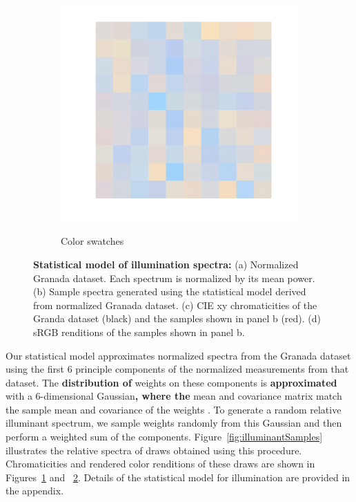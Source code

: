 \documentclass{jov}
\providecommand{\DIFaddtex}[1]{{\bf #1}} %
\providecommand{\DIFdeltex}[1]{} %
\providecommand{\DIFaddbegin}{} %
\providecommand{\DIFaddend}{} %
\providecommand{\DIFdelbegin}{} %
\providecommand{\DIFdelend}{} %
\providecommand{\DIFadd}[1]{\texorpdfstring{\DIFaddtex{#1}}{#1}} %
\providecommand{\DIFdel}[1]{\texorpdfstring{\DIFdeltex{#1}}{}} %
\newcommand{\DIFscaledelfig}{0.5}
\newlength{\DIFdelgraphicswidth} %
\newlength{\DIFdelgraphicsheight} %
\newcommand{\DIFaddincludegraphics}[2][]{{\color{blue}\fbox{\DIFOincludegraphics[#1]{#2}}}} %
\newcommand{\DIFdelincludegraphics}[2][]{%
\sbox{\DIFdelgraphicsbox}{\DIFOincludegraphics[#1]{#2}}%
\settoboxwidth{\DIFdelgraphicswidth}{\DIFdelgraphicsbox} %
\settoboxtotalheight{\DIFdelgraphicsheight}{\DIFdelgraphicsbox} %
\scalebox{\DIFscaledelfig}{%
\parbox[b]{\DIFdelgraphicswidth}{\usebox{\DIFdelgraphicsbox}\\[-\baselineskip] \rule{\DIFdelgraphicswidth}{0em}}\llap{\resizebox{\DIFdelgraphicswidth}{\DIFdelgraphicsheight}{%
\setlength{\unitlength}{\DIFdelgraphicswidth}%
\begin{picture}(1,1)%
\thicklines\linethickness{2pt} %
{\color[rgb]{1,0,0}\put(0,0){\framebox(1,1){}}}%
{\color[rgb]{1,0,0}\put(0,0){\line( 1,1){1}}}%
{\color[rgb]{1,0,0}\put(0,1){\line(1,-1){1}}}%
\end{picture}%
}\hspace*{3pt}}} %
} %
\DeclareRobustCommand{\DIFaddbegin}{\DIFOaddbegin \let\includegraphics\DIFaddincludegraphics} %
\DeclareRobustCommand{\DIFaddend}{\DIFOaddend \let\includegraphics\DIFOincludegraphics} %
\DeclareRobustCommand{\DIFdelbegin}{\DIFOdelbegin \let\includegraphics\DIFdelincludegraphics} %
\DeclareRobustCommand{\DIFdelend}{\DIFOaddend \let\includegraphics\DIFOincludegraphics} %
\begin{document}
\begin{figure}
\begin{subfigure}[b]{0.24 \textwidth}
        \label{fig:xyDiagram}
        \end{subfigure}
      	\begin{subfigure}[b]{0.24 \textwidth}
    \centering
        \caption{Color swatches}
        \includegraphics[width=\textwidth]{../FiguresDraft5/Figure6/Figure6_d.pdf}
        \label{fig:sRGBIlluminant}
    \end{subfigure}
    \caption{{\bf Statistical model of illumination spectra:} (a) Normalized Granada dataset. Each spectrum is normalized by its mean power. (b) Sample spectra generated using the statistical model derived from normalized Granada dataset. (c) CIE xy chromaticities of the Granda dataset (black) and the samples shown in panel b (red). (d) sRGB renditions of the samples shown in panel b.}
\label{fig:illuminant}
\end{figure}

Our statistical model approximates normalized spectra from the Granada dataset using the first 6 principle components of the normalized measurements from that dataset.
The \DIFdelbegin \DIFdel{variation in the }\DIFdelend \DIFaddbegin \DIFadd{distribution of }\DIFaddend weights on these components is \DIFdelbegin \DIFdel{then modeled }\DIFdelend \DIFaddbegin \DIFadd{approximated }\DIFaddend with a 6-dimensional Gaussian\DIFdelbegin \DIFdel{.
The }\DIFdelend \DIFaddbegin \DIFadd{, where the }\DIFaddend mean and covariance matrix \DIFdelbegin \DIFdel{of the Gaussian }\DIFdelend match the sample mean and covariance of the weights \cite{BrainardFreeman}. 
To generate a random relative illuminant spectrum, we sample weights randomly from this Gaussian and then perform a weighted sum of the components\DIFdelbegin \DIFdel{to generate the corresponding spectrum}\DIFdelend .
Figure~\ref{fig:illuminantSamples} illustrates the relative spectra of draws obtained using this procedure.
Chromaticities and rendered color renditions of these draws are shown in Figures~\ref{fig:xyDiagram} and ~\ref{fig:sRGBIlluminant}.
Details of the statistical model for illumination are provided in the appendix.
\end{document}
